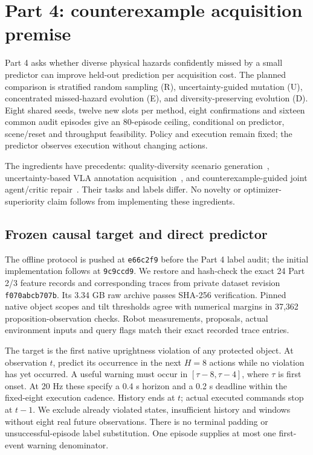 \section{Part 4: counterexample acquisition premise}
\label{sec:part4}
Part 4 asks whether diverse physical hazards confidently missed by a small
predictor can improve held-out prediction per acquisition cost. The planned
comparison is stratified random sampling (R), uncertainty-guided mutation (U),
concentrated missed-hazard evolution (E), and diversity-preserving evolution (D).
Eight shared seeds, twelve new slots per method, eight confirmations and sixteen
common audit episodes give an 80-episode ceiling, conditional on predictor,
scene/reset and throughput feasibility. Policy and execution remain fixed; the
predictor observes execution without changing actions.

The ingredients have precedents: quality-diversity scenario
generation~\cite{fontaine2021scenarios}, uncertainty-based VLA annotation
acquisition~\cite{failurespot}, and counterexample-guided joint agent/critic
repair~\cite{boetius2024repair}. Their tasks and labels differ. No novelty or
optimizer-superiority claim follows from implementing these ingredients.

\subsection{Frozen causal target and direct predictor}
The offline protocol is pushed at \texttt{e66c2f9} before the Part 4 label audit;
the initial implementation follows at \texttt{9c9ccd9}. We restore and hash-check
the exact 24 Part 2/3 feature records and corresponding traces from private dataset
revision \texttt{f070abcb707b}. Its 3.34 GB raw archive passes SHA-256 verification.
Pinned native object scopes and tilt thresholds agree with numerical margins in
37,362 proposition-observation checks. Robot measurements, proposals, actual
environment inputs and query flags match their exact recorded trace entries.

The target is the first native uprightness violation of any protected object.
At observation $t$, predict its occurrence in the next $H=8$ actions while no
violation has yet occurred. A useful warning must occur in
$[\tau-8,\tau-4]$, where $\tau$ is first onset. At 20 Hz these specify a
0.4 s horizon and a 0.2 s deadline within the fixed-eight execution cadence.
History ends at $t$; actual executed commands stop at $t-1$. We exclude
already violated states, insufficient history and windows without eight real
future observations. There is no terminal padding or unsuccessful-episode label
substitution. One episode supplies at most one first-event warning denominator.

